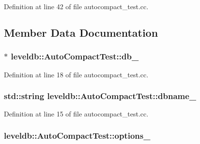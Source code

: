 Definition at line 42 of file autocompact\+\_\+test.\+cc.



\subsection{Member Data Documentation}
\hypertarget{classleveldb_1_1_auto_compact_test_a9e8d5f9bf0546b7d7fdf2128c66d8761}{}
\subsubsection[{db\+\_\+}]{$\ast$ leveldb\+::\+Auto\+Compact\+Test\+::db\+\_\+}\label{classleveldb_1_1_auto_compact_test_a9e8d5f9bf0546b7d7fdf2128c66d8761}


Definition at line 18 of file autocompact\+\_\+test.\+cc.

\hypertarget{classleveldb_1_1_auto_compact_test_a9caaa257e508397f94fbe646893b7b3b}{}
\subsubsection[{dbname\+\_\+}]{\setlength{\rightskip}{0pt plus 5cm}std\+::string leveldb\+::\+Auto\+Compact\+Test\+::dbname\+\_\+}\label{classleveldb_1_1_auto_compact_test_a9caaa257e508397f94fbe646893b7b3b}


Definition at line 15 of file autocompact\+\_\+test.\+cc.

\hypertarget{classleveldb_1_1_auto_compact_test_ad7f1f35214065627e4cadd0468d22c21}{}
\subsubsection[{options\+\_\+}]{ leveldb\+::\+Auto\+Compact\+Test\+::options\+\_\+}\label{classleveldb_1_1_auto_compact_test_ad7f1f35214065627e4cadd0468d22c21}


